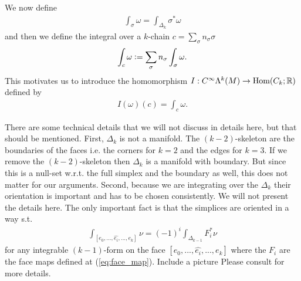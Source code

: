 \documentclass[../main.tex]{subfiles}
\begin{document}
We now define 
\begin{align*}
    \int_\sigma \omega = \int_{\Delta_k} \sigma^* \omega
\end{align*}
and then we define the integral over a $k$-chain 
$c = \sum_\sigma n_\sigma \sigma$
\begin{align*}
    \int_c \omega \vcentcolon= \sum \limits_\sigma n_\sigma \int_\sigma \omega.
\end{align*}
This motivates us to introduce the homomorphism $I: C^\infty \Lambda^k (M) 
\rightarrow \text{Hom}(C_k;\mathbb{R})$ defined by 
\begin{align*}
    I(\omega)(c) = \int_c \omega.
\end{align*}
\begin{remark}
    There are some technical details that we will not discuss in details here,
    but that should be mentioned. First, $\Delta_k$ is not a manifold. 
    The $(k-2)$-skeleton are the boundaries of the faces i.e. the corners for $k=2$ and the 
    edges for $k=3$. If we remove the $(k-2)$-skeleton 
    then $\Delta_k$ is a manifold 
    with boundary. But since this is a null-set w.r.t. the full simplex and 
    the boundary as well, this does not matter for our arguments. 
    Second, because we are integrating over the $\Delta_k$ their orientation is 
    important and has to be chosen consistently. We will not present the details here. The 
    only important fact is that the simplices are oriented in a way s.t.
    \begin{align}
        \int_{[e_0,...,\widehat{e_i}, ..., e_k]} \nu = (-1)^i \int_{\Delta_{k-1}} F_i^* \nu 
        \label{eq:integral_boundary_face}
    \end{align}
    for any integrable $(k-1)$-form on the face $[e_0,...,\widehat{e_i}, ..., e_k]$
    where the $F_i$ are the face maps defined at (\ref{eq:face_map}).
    {\color{red} Include a picture} Please consult \cite[Sec. V.5]{arnold} for more 
    details.
\end{remark}
\end{document}
